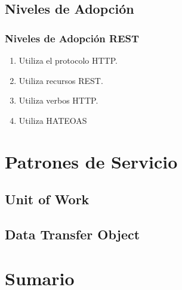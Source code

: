 \documentclass[a4paper,slidestop,xcolor=pst,blue]{beamer}
\begin{document}
\subsection{Niveles de Adopción}

\begin{frame}[c]
    \frametitle{Niveles de Adopción REST}
    \begin{enumerate}[<+->]
        \item Utiliza el protocolo HTTP.
        \item Utiliza recursos REST.
        \item Utiliza verbos HTTP.
        \item Utiliza HATEOAS
    \end{enumerate}
\end{frame}

\section{Patrones de Servicio}

\subsection{Unit of Work}

\subsection{Data Transfer Object}

\section{Sumario}
\end{document}
